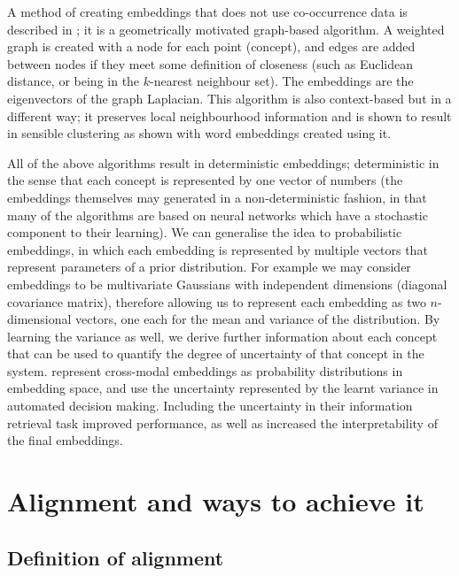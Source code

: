

A method of creating embeddings that does not use co-occurrence data is described in \cite{LaplacianEigenmaps}; it is a geometrically motivated graph-based algorithm. A weighted graph is created with a node for each point (concept), and edges are added between nodes if they meet some definition of closeness (such as Euclidean distance, or being in the $k$-nearest neighbour set). The embeddings are the eigenvectors of the graph Laplacian. This algorithm is also context-based but in a different way; it preserves local neighbourhood information and is shown to result in sensible clustering as shown with word embeddings created using it. 

All of the above algorithms result in deterministic embeddings; deterministic in the sense that each concept is represented by one vector of numbers (the embeddings themselves may generated in a non-deterministic fashion, in that many of the algorithms are based on neural networks which have a stochastic component to their learning). We can generalise the idea to probabilistic embeddings, in which each embedding is represented by multiple vectors that represent parameters of a prior distribution. For example we may consider embeddings to be multivariate Gaussians with independent dimensions (diagonal covariance matrix), therefore allowing us to represent each embedding as two $n$-dimensional vectors, one each for the mean and variance of the distribution. By learning the variance as well, we derive further information about each concept that can be used to quantify the degree of uncertainty of that concept in the system. \cite{ProbabilisticEmbeddingsCrossModal} represent cross-modal embeddings as probability distributions in embedding space, and use the uncertainty represented by the learnt variance in automated decision making. Including the uncertainty in their information retrieval task improved performance, as well as increased the interpretability of the final embeddings.  

\section{Alignment and ways to achieve it}
    
\subsection{Definition of alignment}

